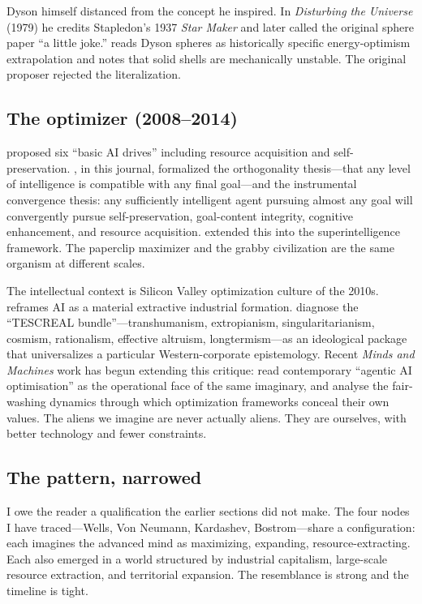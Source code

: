 \documentclass[11pt,a4paper,twocolumn]{article}
\begin{document}
Dyson himself distanced from the concept he inspired. In \textit{Disturbing
the Universe} (1979) he credits Stapledon's 1937 \textit{Star Maker} and
later called the original sphere paper ``a little joke.'' \citet{wright2020}
reads Dyson spheres as historically specific energy-optimism extrapolation
and notes that solid shells are mechanically unstable. The original
proposer rejected the literalization.

\subsection{The optimizer (2008--2014)}

\citet{omohundro2008} proposed six ``basic AI drives'' including resource
acquisition and self-preservation. \citet{bostrom2012}, in this journal,
formalized the orthogonality thesis---that any level of intelligence is
compatible with any final goal---and the instrumental convergence thesis:
any sufficiently intelligent agent pursuing almost any goal will
convergently pursue self-preservation, goal-content integrity, cognitive
enhancement, and resource acquisition. \citet{bostrom2014} extended this
into the superintelligence framework. The paperclip maximizer and the
grabby civilization are the same organism at different scales.

The intellectual context is Silicon Valley optimization culture of the
2010s. \citet{crawford2021} reframes AI as a material extractive
industrial formation. \citet{gebru2024} diagnose the ``TESCREAL
bundle''---transhumanism, extropianism, singularitarianism, cosmism,
rationalism, effective altruism, longtermism---as an ideological package
that universalizes a particular Western-corporate epistemology. Recent
\emph{Minds and Machines} work has begun extending this critique:
\citet{floridi2026} read contemporary ``agentic AI optimisation'' as the
operational face of the same imaginary, and \citet{campione2026} analyse
the fair-washing dynamics through which optimization frameworks conceal
their own values. The aliens we imagine are never actually aliens. They
are ourselves, with better technology and fewer constraints.

\subsection{The pattern, narrowed}

I owe the reader a qualification the earlier sections did not make.
The four nodes I have traced---Wells, Von Neumann, Kardashev, Bostrom---share
a configuration: each imagines the advanced mind as maximizing,
expanding, resource-extracting. Each also emerged in a world structured
by industrial capitalism, large-scale resource extraction, and territorial
expansion. The resemblance is strong and the timeline is tight.
\end{document}
